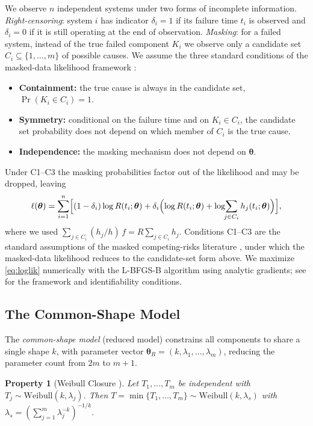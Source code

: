 \documentclass[11pt]{article}
\renewcommand{\v}[1]{\boldsymbol{#1}}
\newtheorem{property}{Property}[section]
\begin{document}
We observe $n$ independent systems under two forms of incomplete information. \emph{Right-censoring}: system $i$ has indicator $\delta_i = 1$ if its failure time $t_i$ is observed and $\delta_i = 0$ if it is still operating at the end of observation. \emph{Masking}: for a failed system, instead of the true failed component $K_i$ we observe only a candidate set $C_i \subseteq \{1, \ldots, m\}$ of possible causes. We assume the three standard conditions of the masked-data likelihood framework \citep{towell2025masked}:
\begin{itemize}
\item[(C1)] \textbf{Containment:} the true cause is always in the candidate set, $\Pr(K_i \in C_i) = 1$.
\item[(C2)] \textbf{Symmetry:} conditional on the failure time and on $K_i \in C_i$, the candidate set probability does not depend on which member of $C_i$ is the true cause.
\item[(C3)] \textbf{Independence:} the masking mechanism does not depend on $\v\theta$.
\end{itemize}
Under C1--C3 the masking probabilities factor out of the likelihood and may be dropped, leaving
\begin{equation}
\label{eq:loglik}
\ell(\v\theta) = \sum_{i=1}^{n} \Bigl[ (1-\delta_i)\log R(t_i;\v\theta) + \delta_i\Bigl( \log R(t_i;\v\theta) + \log\!\!\sum_{j \in C_i} h_j(t_i;\v\theta) \Bigr) \Bigr],
\end{equation}
where we used $\sum_{j\in C_i}(h_j/h)\,f = R\sum_{j\in C_i} h_j$. Conditions C1--C3 are the standard assumptions of the masked competing-risks literature \citep{reiser1995, flehinger1998, sen2001}, under which the masked-data likelihood reduces to the candidate-set form above. We maximize \eqref{eq:loglik} numerically with the L-BFGS-B algorithm \citep{byrd1995} using analytic gradients; see \citet{towell2025masked} for the framework and identifiability conditions.

\subsection{The Common-Shape Model}

The \emph{common-shape model} (reduced model) constrains all components to share a single shape $k$, with parameter vector $\v\theta_R = (k, \lambda_1, \ldots, \lambda_m)$, reducing the parameter count from $2m$ to $m+1$.

\begin{property}[Weibull Closure {\citep{barlow1975}}]
\label{prop:weibull-closure}
Let $T_1, \ldots, T_m$ be independent with $T_j \sim \text{Weibull}(k, \lambda_j)$. Then $T = \min\{T_1, \ldots, T_m\} \sim \text{Weibull}(k, \lambda_s)$ with $\lambda_s = (\sum_{j=1}^{m} \lambda_j^{-k})^{-1/k}$.
\end{property}
\end{document}
